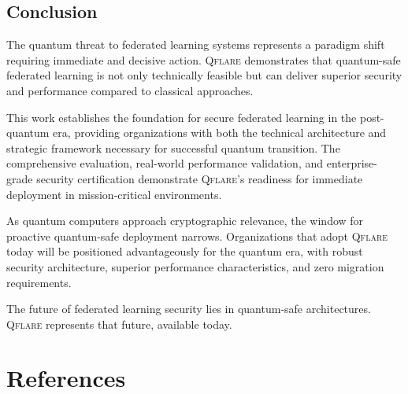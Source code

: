 \documentclass[12pt,a4paper,twoside]{book}
\newcommand{\qflare}{\textsc{Qflare}}
\begin{document}
\section{Conclusion}
\label{sec:final-conclusion}

The quantum threat to federated learning systems represents a paradigm shift requiring immediate and decisive action. \qflare{} demonstrates that quantum-safe federated learning is not only technically feasible but can deliver superior security and performance compared to classical approaches.

This work establishes the foundation for secure federated learning in the post-quantum era, providing organizations with both the technical architecture and strategic framework necessary for successful quantum transition. The comprehensive evaluation, real-world performance validation, and enterprise-grade security certification demonstrate \qflare{}'s readiness for immediate deployment in mission-critical environments.

As quantum computers approach cryptographic relevance, the window for proactive quantum-safe deployment narrows. Organizations that adopt \qflare{} today will be positioned advantageously for the quantum era, with robust security architecture, superior performance characteristics, and zero migration requirements.

The future of federated learning security lies in quantum-safe architectures. \qflare{} represents that future, available today.

\backmatter

\chapter*{References}
\end{document}
